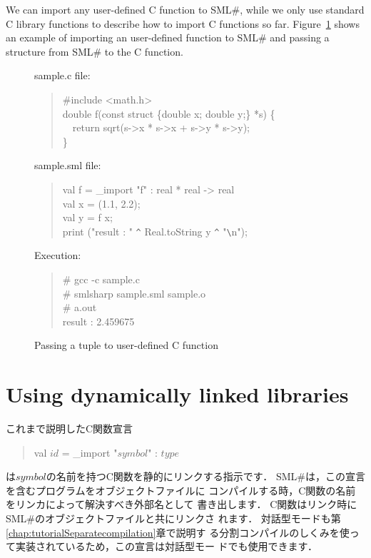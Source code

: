 \documentclass{jbook}
\newif\ifjp
\newcommand{\txt}[2]{#2}
\newcommand{\smlsharp}{SML\#}
\newcommand{\myem}{\mbox{\ \ }}
\newenvironment{program}{\begin{quote}\begin{tt}}%
                        {\end{tt}\end{quote}}
\begin{document}
	We can import any user-defined C function to \smlsharp{},
while we only use standard C library functions to describe how to
import C functions so far.
	Figure~\ref{fig:sampleStruct} shows an example of importing
an user-defined function to \smlsharp{} and passing a structure from
\smlsharp{} to the C function.

\begin{figure}
\begin{center}
\begin{minipage}{0.9\textwidth}
sample.c file:
\begin{program}
\#include <math.h>\\
double f(const struct \{double x; double y;\} *s) \{\\
\myem  return sqrt(s->x * s->x + s->y * s->y);\\
\}
\end{program}
sample.sml file:
\begin{program}
val f = \_import "f" : real * real -> real\\
val x = (1.1, 2.2);\\
val y = f x;\\
print ("result : " \verb|^| Real.toString y \verb|^| "\verb|\|n");\\
\end{program}
Execution:
\begin{program}
\# gcc -c sample.c\\
\# smlsharp sample.sml sample.o\\
\# a.out\\
result : 2.459675\\
\end{program}
\end{minipage}
\end{center}
\caption{Passing a tuple to user-defined C function}
\label{fig:sampleStruct}
\end{figure}

\fi%


\section{\txt{動的リンクライブラリの使用}{Using dynamically linked libraries}}
\label{sec:tutorialDynamiclinc}

\ifjp%
	これまで説明したC関数宣言
\begin{program}
val $\mathit{id}$ = \_import "$\mathit{symbol}$" : $\mathit{type}$
\end{program}
は$\mathit{symbol}$の名前を持つC関数を静的にリンクする指示です．
	\smlsharp{}は，この宣言を含むプログラムをオブジェクトファイルに
コンパイルする時，C関数の名前をリンカによって解決すべき外部名として
書き出します．
	C関数はリンク時に\smlsharp{}のオブジェクトファイルと共にリンクさ
れます．
	対話型モードも第\ref{chap:tutorialSeparatecompilation}章で説明す
る分割コンパイルのしくみを使って実装されているため，この宣言は対話型モー
ドでも使用できます．
\end{document}
